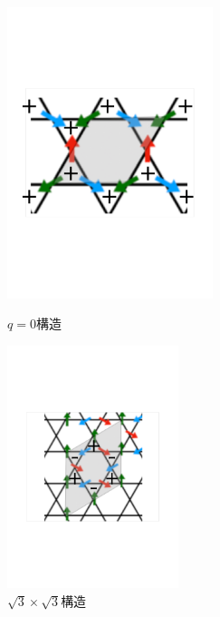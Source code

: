 \documentclass[12pt,titlepage,dvipdfmx]{jarticle}
\begin{document}
\begin{figure}[H]
   \begin{minipage}{0.5\hsize}
    \begin{center}
     \includegraphics[width=6cm]{figure/q0.pdf}
    \end{center}
    \caption{$q=0$構造}
   \end{minipage}
   \begin{minipage}{0.5\hsize}
    \begin{center}
     \includegraphics[width=5cm]{figure/sqrt3.pdf}
    \end{center}
    \caption{$\sqrt{3}\times\sqrt{3}$構造}
   \end{minipage}
\end{figure}

\end{document}
